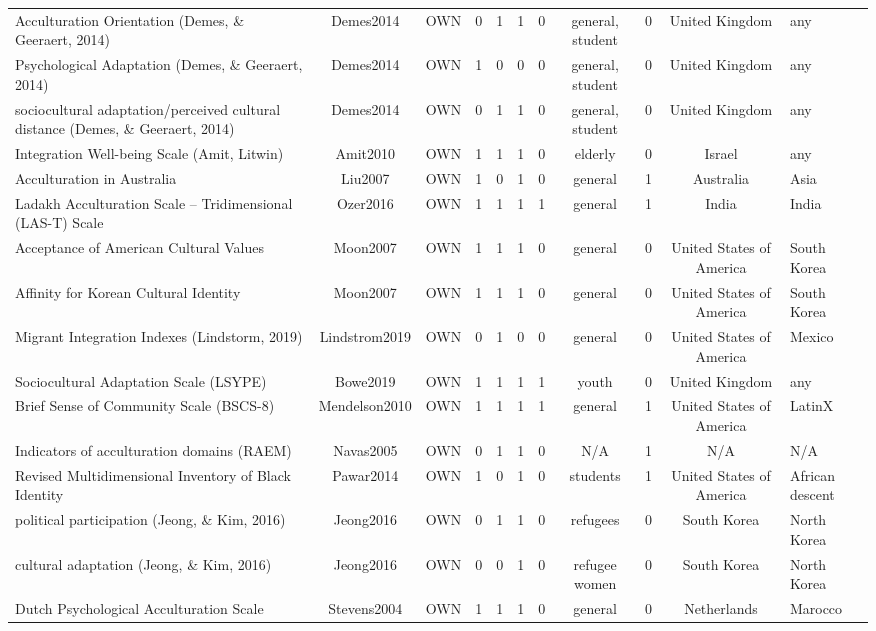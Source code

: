 \begin{longtable}[l]{lclclclclcl}
Acculturation Orientation (Demes, \& Geeraert, 2014) & Demes2014 & OWN & 0 & 1 & 1 & 0 & general, student & 0 & United Kingdom & any\\
Psychological Adaptation (Demes, \& Geeraert, 2014) & Demes2014 & OWN & 1 & 0 & 0 & 0 & general, student & 0 & United Kingdom & any\\
sociocultural adaptation/perceived cultural distance (Demes, \& Geeraert, 2014) & Demes2014 & OWN & 0 & 1 & 1 & 0 & general, student & 0 & United Kingdom & any\\
Integration Well-being Scale (Amit, Litwin) & Amit2010 & OWN & 1 & 1 & 1 & 0 & elderly & 0 & Israel & any\\
Acculturation in Australia & Liu2007 & OWN & 1 & 0 & 1 & 0 & general & 1 & Australia & Asia\\
Ladakh Acculturation Scale – Tridimensional (LAS-T) Scale & Ozer2016 & OWN & 1 & 1 & 1 & 1 & general & 1 & India & India\\
Acceptance of American Cultural Values & Moon2007 & OWN & 1 & 1 & 1 & 0 & general & 0 & United States of America & South Korea\\
Affinity for Korean Cultural Identity & Moon2007 & OWN & 1 & 1 & 1 & 0 & general & 0 & United States of America & South Korea\\
Migrant Integration Indexes (Lindstorm, 2019) & Lindstrom2019 & OWN & 0 & 1 & 0 & 0 & general & 0 & United States of America & Mexico\\
Sociocultural Adaptation Scale (LSYPE) & Bowe2019 & OWN & 1 & 1 & 1 & 1 & youth & 0 & United Kingdom & any\\
Brief Sense of Community Scale (BSCS-8) & Mendelson2010 & OWN & 1 & 1 & 1 & 1 & general & 1 & United States of America & LatinX\\
Indicators of acculturation domains (RAEM) & Navas2005 & OWN & 0 & 1 & 1 & 0 & N/A & 1 & N/A & N/A\\
Revised Multidimensional Inventory of Black Identity & Pawar2014 & OWN & 1 & 0 & 1 & 0 & students & 1 & United States of America & African descent\\
political participation (Jeong, \& Kim, 2016) & Jeong2016 & OWN & 0 & 1 & 1 & 0 & refugees & 0 & South Korea & North Korea\\
cultural adaptation (Jeong, \& Kim, 2016) & Jeong2016 & OWN & 0 & 0 & 1 & 0 & refugee women & 0 & South Korea & North Korea\\
Dutch Psychological Acculturation Scale & Stevens2004 & OWN & 1 & 1 & 1 & 0 & general & 0 & Netherlands & Marocco\\

\end{longtable}
